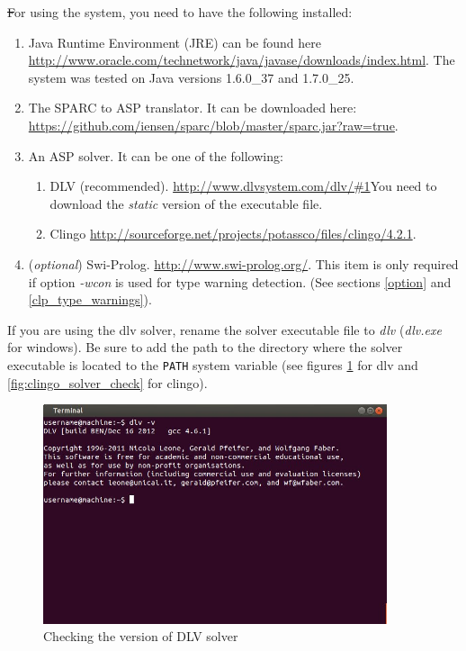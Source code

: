 \documentclass[12pt, letterpaper]{article}
\begin{document}
\st For using the system, you need to have the following installed:
\begin{enumerate}
\item Java Runtime Environment (JRE) can be found here \url{http://www.oracle.com/technetwork/java/javase/downloads/index.html}.
The system was tested on Java versions 1.6.0\_37 and 1.7.0\_25.
\item The SPARC to ASP translator. It can be downloaded here: \url{https://github.com/iensen/sparc/blob/master/sparc.jar?raw=true}.
\item An ASP solver. It can be one of the following:
\begin{enumerate} 
\item DLV (recommended).
 \url{http://www.dlvsystem.com/dlv/#1}You need to download the \textit{static} version of the executable file.
\item Clingo \url{http://sourceforge.net/projects/potassco/files/clingo/4.2.1}.
\end{enumerate}

\item (\textit{optional}) Swi-Prolog. \url{http://www.swi-prolog.org/}. This item is only required if option \textit{-wcon} is used for type warning detection.
(See sections \ref{option} and \ref{clp_type_warnings}).

\end{enumerate}
If you are using the dlv solver, rename the solver executable file to \textit{dlv} (\textit{dlv.exe} for windows).
Be sure to add the path to the directory where the solver executable is located to the \texttt{PATH} system variable (see figures \ref{fig:dlv_solver_check} for dlv and \ref{fig:clingo_solver_check} for clingo).

\begin{figure}[p]
\centering
\includegraphics[width=0.9\textwidth]{dlv_version.jpg}
\caption{Checking the version of DLV solver}
\label{fig:dlv_solver_check}
\end{figure}
\end{document}
